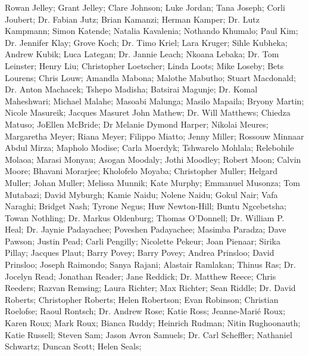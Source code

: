     Rowan Jelley;
    Grant Jelley;
    Clare Johnson;
    Luke Jordan;
    Tana Joseph;
    Corli Joubert;
Dr. Fabian Jutz;
    Brian Kamanzi;
    Herman Kamper;
Dr. Lutz Kampmann;
    Simon Katende;
    Natalia Kavalenia;
    Nothando Khumalo;
    Paul Kim;
Dr. Jennifer Klay;
    Grove Koch;
Dr. Timo Kriel;
    Lara Kruger;
    Sihle Kubheka;
    Andrew Kubik;
    Luca Lategan;
Dr. Jannie Leach;
    Nkoana Lebaka;
Dr. Tom Leinster;
    Henry Liu;
    Christopher Loetscher;
    Linda Loots;
    Mike Loseby;
    Bets Lourens;
    Chris Louw;
    Amandla Mabona;
    Malothe Mabutho;
    Stuart Macdonald;
Dr. Anton Machacek;
    Tshepo Madisha;
    Batsirai Magunje;
Dr. Komal Maheshwari;
    Michael Malahe;
    Masoabi Malunga;
    Masilo Mapaila;
    Bryony Martin;
    Nicole Masureik;
    Jacques Masuret
    John Mathew;
Dr. Will Matthews;
    Chiedza Matuso;
    JoEllen McBride;
    Dr Melanie Dymond Harper;
    Nikolai Meures;
    Margaretha Meyer;
    Riana Meyer;
    Filippo Miatto;
    Jenny Miller;
    Rossouw Minnaar
    Abdul Mirza;
    Mapholo Modise;
    Carla Moerdyk;
    Tshwarelo Mohlala;
    Relebohile Molaoa;
    Marasi Monyau;
    Asogan Moodaly;
    Jothi Moodley;
    Robert Moon;
    Calvin Moore;
    Bhavani Morarjee;
    Kholofelo Moyaba;
    Christopher Muller;
    Helgard Muller;
    Johan Muller;
    Melissa Munnik;
    Kate Murphy;
    Emmanuel Musonza;
    Tom Mutabazi;
    David Myburgh;
    Kamie Naidu;
    Nolene Naidu;
    Gokul Nair;
    Vafa Naraghi;
    Bridget Nash;
    Tyrone Negus;
    Huw Newton-Hill;
    Buntu Ngcebetsha;
    Towan Nothling;
Dr. Markus Oldenburg;
    Thomas O’Donnell;
Dr. William P. Heal;
Dr. Jaynie Padayachee;
    Poveshen Padayachee;
    Masimba Paradza;
    Dave Pawson;
    Justin Pead;
    Carli Pengilly;
    Nicolette Pekeur;
    Joan Pienaar;
    Sirika Pillay;
    Jacques Plaut;
    Barry Povey;
    Barry Povey;
    Andrea Prinsloo;
    David Prinsloo;
    Joseph Raimondo;
    Sanya Rajani;
    Alastair Ramlakan;
    Thinus Ras;
Dr. Jocelyn Read;
    Jonathan Reader;
    Jane Reddick;
Dr. Matthew Reece;
    Chris Reeders;
    Razvan Remsing;
    Laura Richter;
    Max Richter;
    Sean Riddle;
Dr. David Roberts;
    Christopher Roberts;
    Helen Robertson;
    Evan Robinson;
    Christian Roelofse;
    Raoul Rontsch;
Dr. Andrew Rose;
    Katie Ross;
    Jeanne-Marié Roux;
    Karen Roux;
    Mark Roux;
    Bianca Ruddy;
    Heinrich Rudman;
    Nitin Rughoonauth;
    Katie Russell;
    Steven Sam;
    Jason Avron Samuels;
Dr. Carl Scheffler;
    Nathaniel Schwartz;
    Duncan Scott;
    Helen Seals;
